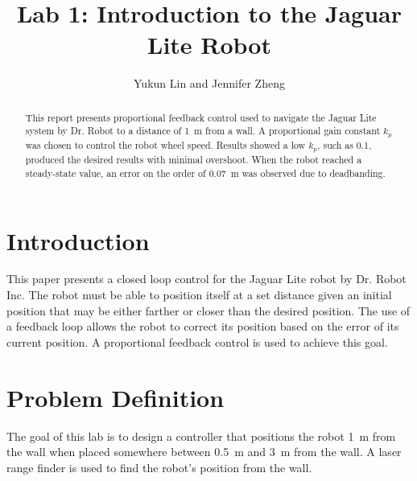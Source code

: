 \documentclass[conference]{IEEEtran}
\begin{document}
\title{Lab 1: Introduction to the Jaguar Lite Robot}
\author{Yukun Lin and Jennifer Zheng}

\maketitle

\begin{abstract}
This report presents proportional feedback control used to navigate the Jaguar Lite system
by Dr. Robot to a distance of \SI{1}{\meter} from a wall. A proportional gain constant
$k_{p}$ was chosen to control the robot wheel speed. Results showed a low $k_{p}$, such as
0.1, produced the desired results with minimal overshoot. When the robot reached a
steady-state value, an error on the order of \SI{0.07}{\meter} was observed due to
deadbanding.
\end{abstract}

\section{Introduction}
This paper presents a closed loop control for the Jaguar Lite robot by Dr. Robot Inc. The
robot must be able to position itself at a set distance given an initial position that may
be either farther or closer than the desired position. The use of a feedback loop allows
the robot to correct its position based on the error of its current position. A
proportional feedback control is used to achieve this goal.

\section{Problem Definition}
The goal of this lab is to design a controller that positions the robot
\SI{1}{\meter} from the wall when placed somewhere
between \SI{0.5}{\meter} and \SI{3}{\meter} from the wall. A laser range finder is
used to find the robot's position from the wall.
\end{document}
